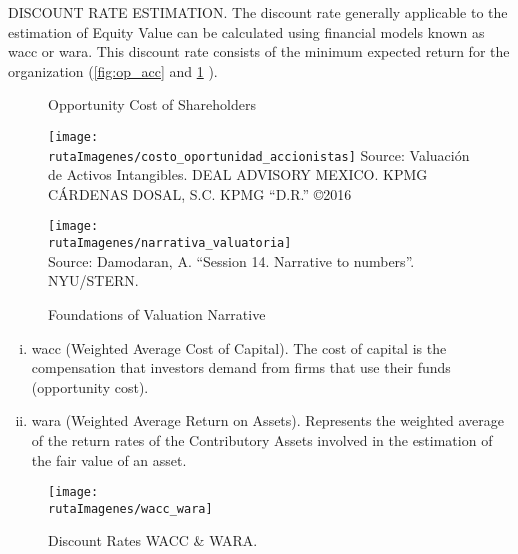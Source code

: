 \textcolor{secundario}{DISCOUNT RATE ESTIMATION.} 
The discount rate generally applicable to the estimation of Equity Value can be calculated using financial models known as \gls{wacc} or \gls{wara}. This discount rate consists of the minimum expected return for the organization (\autoref{fig:op_acc} and \ref{fig:narr_val} ).

\begin{figure}[H]
\centering
\begin{minipage}{8cm}
\caption{Opportunity Cost of Shareholders \label{fig:op_acc}}\vspace{5pt}
\texttt{[image: \\rutaImagenes/costo\_oportunidad\_accionistas]}
\footnotesize{Source: Valuaci\'on de Activos Intangibles. DEAL ADVISORY MEXICO. KPMG C\'ARDENAS DOSAL, S.C. KPMG ``D.R.'' \copyright 2016}
\end{minipage}
\quad
\begin{minipage}{8cm}
\caption{Foundations of Valuation Narrative \label{fig:narr_val}}\vspace{5pt}
\texttt{[image: \\rutaImagenes/narrativa\_valuatoria]}\\
\footnotesize{Source: Damodaran, A. ``Session 14. Narrative to numbers''. NYU/STERN.}

\end{minipage}

\end{figure}

\begin{enumerate}[i)]
\item \textcolor{secundario}{\gls{wacc}} (Weighted Average Cost of Capital). The cost of capital is the compensation that investors demand from firms that use their funds (opportunity cost).
\item \textcolor{secundario}{\gls{wara}} (Weighted Average Return on Assets). Represents the weighted average of the return rates of the Contributory Assets involved in the estimation of the fair value of an  asset.
\end{enumerate}

\begin{figure}[H]
\centering
\caption{Discount Rates WACC \& WARA.\label{fig:wacc_wara}}\vspace{5pt}
\texttt{[image: \\rutaImagenes/wacc\_wara]}
\end{figure}